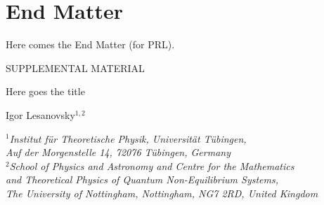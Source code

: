 \documentclass[reprint,twocolumn,showpacs,superscriptaddress,longbibliography,email,floatfix,aps,prl]{revtex4-2}
\begin{document}



\setcounter{equation}{0}
\setcounter{figure}{0}
\renewcommand{\theequation}{A\arabic{equation}}
\renewcommand{\thefigure}{A\arabic{figure}}


\section*{End Matter}

Here comes the End Matter (for PRL). \\


\onecolumngrid
\newpage

\setcounter{equation}{0}
\setcounter{page}{1}

\setcounter{figure}{0}
\setcounter{table}{0}
\makeatletter
\renewcommand{\theequation}{S\arabic{equation}}
\renewcommand{\thefigure}{S\arabic{figure}}
\renewcommand{\thetable}{S\arabic{table}}
\setcounter{secnumdepth}{1}



\begin{center}
{\Large SUPPLEMENTAL MATERIAL}
\end{center}
\begin{center}
\vspace{0.8cm}
{\Large Here goes the title}
\end{center}
\begin{center}
Igor Lesanovsky$^{1,2}$
\end{center}
\begin{center}
$^1${\em Institut f\"ur Theoretische Physik, Universit\"at T\"ubingen,}\\
{\em Auf der Morgenstelle 14, 72076 T\"ubingen, Germany}\\
$^2${\em School of Physics and Astronomy and Centre for the Mathematics}\\
{\em and Theoretical Physics of Quantum Non-Equilibrium Systems,}\\ 
{\em The University of Nottingham, Nottingham, NG7 2RD, United Kingdom}
\end{center}



\end{document}
